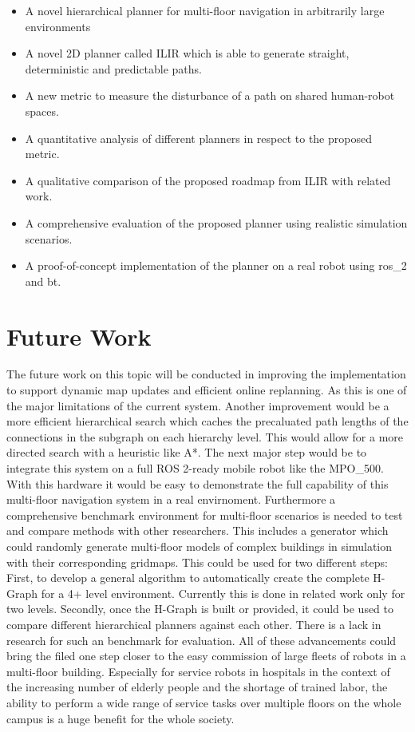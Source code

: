 \begin{itemize}
    \item A novel hierarchical planner for multi-floor navigation in arbitrarily large environments
    \item A novel 2D planner called ILIR which is able to generate straight, deterministic and predictable paths.
    \item A new metric to measure the disturbance of a path on shared human-robot spaces.
    \item A quantitative analysis of different planners in respect to the proposed metric.
    \item A qualitative comparison of the proposed roadmap from ILIR with related work.
    \item A comprehensive evaluation of the proposed planner using realistic simulation scenarios.
    \item A proof-of-concept implementation of the planner on a real robot using \gls{ros_2} and \gls{bt}.
\end{itemize}

\section{Future Work}
\label{sec:future_work}

The future work on this topic will be conducted in improving the implementation to support dynamic map updates and efficient online replanning. As this is one of the major limitations of the current system. Another improvement would be a more efficient hierarchical search which caches the precaluated path lengths of the connections in the subgraph on each hierarchy level. This would allow for a more directed search with a heuristic like A*. The next major step would be to integrate this system on a full ROS 2-ready mobile robot like the MPO\_500. With this hardware it would be easy to demonstrate the full capability of this multi-floor navigation system in a real envirnoment. Furthermore a comprehensive benchmark environment for multi-floor scenarios is needed to test and compare methods with other researchers. This includes a generator which could randomly generate multi-floor models of complex buildings in simulation with their corresponding gridmaps. This could be used for two different steps: First, to develop a general algorithm to automatically create the complete H-Graph for a 4+ level environment. Currently this is done in related work only for two levels. Secondly, once the H-Graph is built or provided, it could be used to compare different hierarchical planners against each other. There is a lack in research for such an benchmark for evaluation. All of these advancements could bring the filed one step closer to the easy commission of large fleets of robots in a multi-floor building. Especially for service robots in hospitals in the context of the increasing number of elderly people and the shortage of trained labor, the ability to perform a wide range of service tasks over multiple floors on the whole campus is a huge benefit for the whole society.
